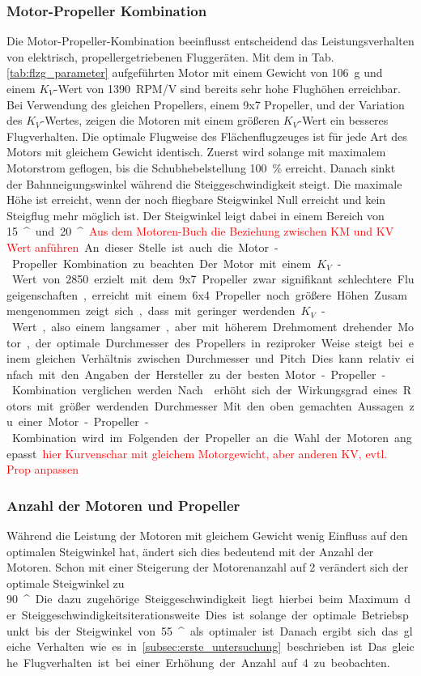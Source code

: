 \subsubsection{Motor-Propeller Kombination}
Die Motor-Propeller-Kombination beeinflusst entscheidend das Leistungsverhalten von elektrisch, propellergetriebenen Fluggeräten. Mit dem in Tab. \ref{tab:flzg_parameter} aufgeführten Motor mit einem Gewicht von \SI{106}{g} und einem \ensuremath{K_V}-Wert von \SI{1390}{RPM/V} sind bereits sehr hohe Flughöhen erreichbar. Bei Verwendung des gleichen Propellers, einem 9x7 Propeller, und der Variation des \ensuremath{K_V}-Wertes, zeigen die Motoren mit einem größeren \ensuremath{K_V}-Wert ein besseres Flugverhalten. Die optimale Flugweise des Flächenflugzeuges ist für jede Art des Motors mit gleichem Gewicht identisch. Zuerst wird solange mit maximalem Motorstrom geflogen, bis die Schubhebelstellung \SI{100}{\%} erreicht. Danach sinkt der Bahnneigungswinkel während die Steiggeschwindigkeit steigt. Die maximale Höhe ist erreicht, wenn der noch fliegbare Steigwinkel Null erreicht und kein Steigflug mehr möglich ist. Der Steigwinkel leigt dabei in einem Bereich von \SI{15}{^\circ} und \SI{20}{^\circ}.
\textcolor{red}{Aus dem Motoren-Buch die Beziehung zwischen KM und KV Wert anführen}
An dieser Stelle ist auch die Motor-Propeller Kombination zu beachten. Der Motor mit einem \ensuremath{K_V}-Wert von 2850 erzielt mit dem 9x7 Propeller zwar signifikant schlechtere Flugeigenschaften, erreicht mit einem 6x4 Propeller noch größere Höhen. Zusammengenommen zeigt sich, dass mit geringer werdenden \ensuremath{K_V}-Wert, also einem langsamer, aber mit höherem Drehmoment drehender Motor, der optimale Durchmesser des Propellers in reziproker Weise steigt bei einem gleichen Verhältnis zwischen Durchmesser und Pitch. Dies kann relativ einfach mit den Angaben der Hersteller zu der besten Motor-Propeller-Kombination verglichen werden. Nach \cite{Wall.2015} erhöht sich der Wirkungsgrad eines Rotors mit größer werdenden Durchmesser. 
Mit den oben gemachten Aussagen zu einer Motor-Propeller-Kombination wird im Folgenden der Propeller an die Wahl der Motoren angepasst.
\textcolor{red}{hier Kurvenschar mit gleichem Motorgewicht, aber anderen KV, evtl. Prop anpassen}
\subsubsection{Anzahl der Motoren und Propeller}
Während die Leistung der Motoren mit gleichem Gewicht wenig Einfluss auf den optimalen Steigwinkel hat, ändert sich dies bedeutend mit der Anzahl der Motoren. Schon mit einer Steigerung der Motorenanzahl auf 2 verändert sich der optimale Steigwinkel zu \SI{90}{^\circ}. Die dazu zugehörige Steiggeschwindigkeit liegt hierbei beim Maximum der Steiggeschwindigkeitsiterationsweite. Dies ist solange der optimale Betriebspunkt bis der Steigwinkel von \SI{55}{^\circ} als optimaler ist. Danach ergibt sich das gleiche Verhalten wie es in \ref{subsec:erste_untersuchung} beschrieben ist. Das gleiche Flugverhalten ist bei einer Erhöhung der Anzahl auf 4 zu beobachten.


